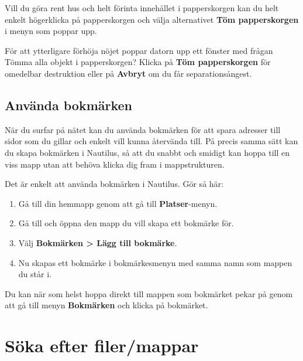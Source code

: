 \documentclass[a4paper,final]{memoir} %
\begin{document}
Vill du göra rent hus och helt förinta innehållet i papperskorgen kan du helt enkelt högerklicka på papperskorgen och välja alternativet \textbf{Töm papperskorgen} i menyn som poppar upp.

För att ytterligare förhöja nöjet poppar datorn upp ett fönster med frågan Tömma alla objekt i papperskorgen? Klicka på \textbf{Töm papperskorgen} för omedelbar destruktion eller på \textbf{Avbryt} om du får separationsångest.


\subsection{Använda bokmärken}


När du surfar på nätet kan du använda bokmärken för att spara adresser till sidor som du gillar och enkelt vill kunna återvända till. På precis samma sätt kan du skapa bokmärken i Nautilus, så att du snabbt och smidigt kan hoppa till en viss mapp utan att behöva klicka dig fram i mappstrukturen.

Det är enkelt att använda bokmärken i Nautilus. Gör så här:

\begin{enumerate}

\item Gå till din hemmapp genom att gå till \textbf{Platser}-menyn.
\item Gå till och öppna den mapp du vill skapa ett bokmärke för.
\item Välj \textbf{Bokmärken \textgreater{} Lägg till bokmärke}. 
\item Nu skapas ett bokmärke i bokmärkesmenyn med samma namn som mappen du står i. 

\end{enumerate}

Du kan när som helst hoppa direkt till mappen som bokmärket pekar på genom att gå till menyn \textbf{Bokmärken} och klicka på bokmärket.


\section{Söka efter filer/mappar}
\end{document}
